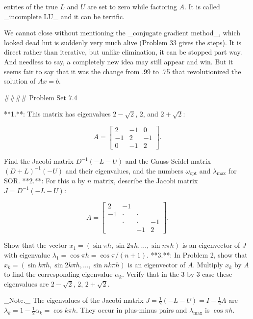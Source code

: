 entries of the true \(L\) and \(U\) are set to zero while factoring \(A\). It is called _incomplete LU_ and it can be terrific.

We cannot close without mentioning the _conjugate gradient method_, which looked dead hut is suddenly very much alive (Problem 33 gives the steps). It is direct rather than iterative, but unlike elimination, it can be stopped part way. And needless to say, a completely new idea may still appear and win. But it seems fair to say that it was the change from .99 to .75 that revolutionized the solution of \(Ax=b\).

#### Problem Set 7.4

**1.**: This matrix has eigenvalues \(2-\sqrt{2}\), \(2\), and \(2+\sqrt{2}\):

\[A=\begin{bmatrix}2&-1&0\\ -1&2&-1\\ 0&-1&2\end{bmatrix}.\]

Find the Jacobi matrix \(D^{-1}(-L-U)\) and the Gauss-Seidel matrix \((D+L)^{-1}(-U)\) and their eigenvalues, and the numbers \(\omega_{\text{opt}}\) and \(\lambda_{\text{max}}\) for SOR.
**2.**: For this \(n\) by \(n\) matrix, describe the Jacobi matrix \(J=D^{-1}(-L-U)\):

\[A=\begin{bmatrix}2&-1&&\\ -1&\cdot&\cdot&\\ &\cdot&\cdot&-1\\ &&-1&2\end{bmatrix}.\]

Show that the vector \(x_{1}=(\sin\pi h,\sin 2\pi h,\ldots,\sin n\pi h)\) is an eigenvector of \(J\) with eigenvalue \(\lambda_{1}=\cos\pi h=\cos\pi/(n+1)\).
**3.**: In Problem 2, show that \(x_{k}=(\sin k\pi h,\sin 2k\pi h,\ldots,\sin nk\pi h)\) is an eigenvector of \(A\). Multiply \(x_{k}\) by \(A\) to find the corresponding eigenvalue \(\alpha_{k}\). Verify that in the 3 by 3 case these eigenvalues are \(2-\sqrt{2}\), \(2\), \(2+\sqrt{2}\).

_Note._ The eigenvalues of the Jacobi matrix \(J=\frac{1}{2}(-L-U)=I-\frac{1}{2}A\) are \(\lambda_{k}=1-\frac{1}{2}\alpha_{k}=\cos k\pi h\). They occur in plus-minus pairs and \(\lambda_{\text{max}}\) is \(\cos\pi h\).

 